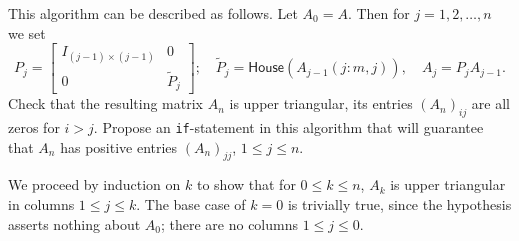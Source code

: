 \documentclass{../../../kin_math}
\begin{document}
\begin{questions}
\begin{enumerate}
    This algorithm can be described as follows. Let $A_0 = A$. Then for $j = 1, 2, \dots, n$ we set
    \begin{equation*}
      P_j = \begin{bmatrix} I_{(j - 1) \times (j - 1)} & 0 \\ 0 & \tilde{P}_j \end{bmatrix}; \quad \tilde{P}_j = \textsf{House}(A_{j - 1}(j : m, j)), \quad A_j = P_jA_{j - 1}.
    \end{equation*}
    Check that the resulting matrix $A_n$ is upper triangular, its entries $(A_n)_{ij}$ are all zeros for $i > j$. Propose an \texttt{if}-statement in this algorithm that will guarantee that $A_n$ has positive entries $(A_n)_{jj}$, $1 \leq j \leq n$.
    \begin{solution}
      We proceed by induction on $k$ to show that for $0 \leq k \leq n$, $A_k$ is upper triangular in columns $1 \leq j \leq k$. The base case of $k = 0$ is trivially true, since the hypothesis asserts nothing about $A_0$; there are no columns $1 \leq j \leq 0$.


\end{solution}
\end{enumerate}
\end{questions}
\end{document}
